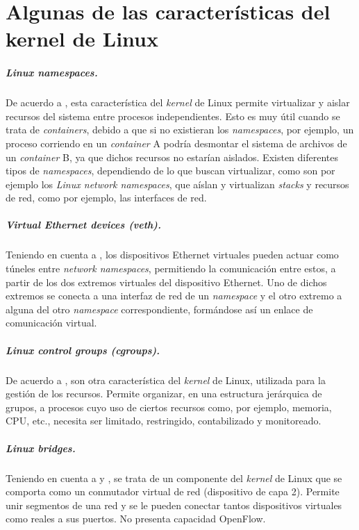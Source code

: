 
\chapter{Algunas de las características del kernel de Linux} %

\label{AppendixB} %


\paragraph{Linux namespaces.} 
De acuerdo a \parencite{linux_namespaces}, esta característica del \textit{kernel} de Linux permite  virtualizar y aislar recursos del sistema entre procesos independientes. Esto es muy útil cuando se trata de \textit{containers}, debido a que si no existieran los \textit{namespaces}, por ejemplo, un proceso corriendo en un \textit{container} A podría desmontar el sistema de archivos de un \textit{container} B, ya que dichos recursos no estarían aislados. Existen diferentes tipos de \textit{namespaces}, dependiendo de lo que buscan virtualizar, como son por ejemplo los \textit{Linux network namespaces}, que  aíslan y virtualizan \textit{stacks} y recursos de red, como por ejemplo, las interfaces de red.


\paragraph{Virtual Ethernet devices (veth).}
Teniendo en cuenta a \parencite{veth}, los dispositivos Ethernet virtuales pueden actuar como túneles entre \textit{network namespaces}, permitiendo la  comunicación entre estos, a partir de los dos extremos virtuales del dispositivo Ethernet. Uno de dichos extremos se conecta a una interfaz de red de un \textit{namespace} y  el otro extremo a alguna del otro \textit{namespace} correspondiente, formándose así un enlace de comunicación virtual.


\paragraph{Linux control groups (cgroups).}
De acuerdo a \parencite{cgroups}, son otra característica del \textit{kernel} de Linux, utilizada para la gestión de los recursos. Permite organizar, en una estructura jerárquica de grupos, a procesos cuyo uso de ciertos recursos como, por ejemplo, memoria, CPU, etc., necesita ser limitado, restringido, contabilizado y monitoreado.

\paragraph{Linux bridges.}
Teniendo en cuenta a \parencite{linux_bridge_1} y \parencite{linux_bridge_2}, se trata de un componente del \textit{kernel} de Linux que se comporta como un conmutador virtual de red (dispositivo de capa 2). Permite unir segmentos de una red y se le pueden conectar tantos dispositivos virtuales como reales a sus puertos. No presenta capacidad OpenFlow. 